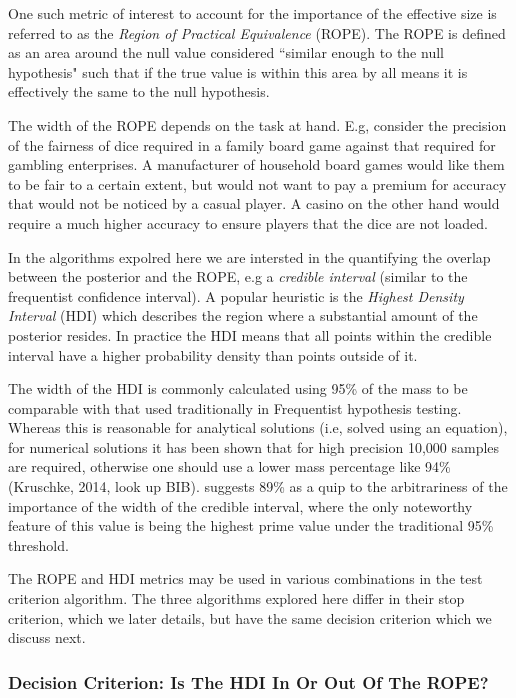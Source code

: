 One such metric of interest to account for the importance of the effective size
is referred to as the
\textit{Region of Practical Equivalence} (ROPE).
The ROPE is defined as an area around the null value considered “similar enough 
to the null hypothesis" such that if the true value is within this area by all
means it is effectively the same to the null hypothesis.

The width of the ROPE depends on the task at hand.
E.g, consider the precision of the fairness of dice required in a family board game
against that required for gambling enterprises.
A manufacturer of household board games would like them to be fair to a certain extent,
but would not want to pay a premium for accuracy that would not be noticed by a casual
player. A casino on the other hand would require a much higher accuracy to ensure
players that the dice are not loaded.

In the algorithms expolred here we are intersted in the quantifying the overlap
between the posterior and the ROPE, e.g a \textit{credible interval} (similar to the frequentist confidence interval).
A popular heuristic is the \textit{Highest Density Interval} (HDI)
which describes the region where a substantial amount of the posterior resides.
In practice the HDI means that all points within the credible interval have a higher
probability density than points outside of it.

The width of the HDI is commonly calculated using 95\% of the mass to be comparable
with that used traditionally in Frequentist hypothesis testing.
Whereas this is reasonable for analytical solutions (i.e, solved using an equation),
for numerical solutions it has been shown that for high precision 10,000 samples are
required, otherwise one should use a lower mass percentage like 94\% (Kruschke, 2014, look up BIB).
\cite{mcelreath2016} suggests 89\% as a quip to the arbitrariness of the importance of the
width of the credible interval, where the only noteworthy feature of this value is being
the highest prime value under the traditional 95\% threshold.  

The ROPE and HDI metrics may be used in various combinations in the
test criterion algorithm.
The three algorithms explored here differ in their stop criterion, which we later
details, but have the same decision criterion which we discuss next.


\subsubsection{Decision Criterion: Is The HDI In Or Out Of The ROPE?}\label{sec:decision_criterion}

